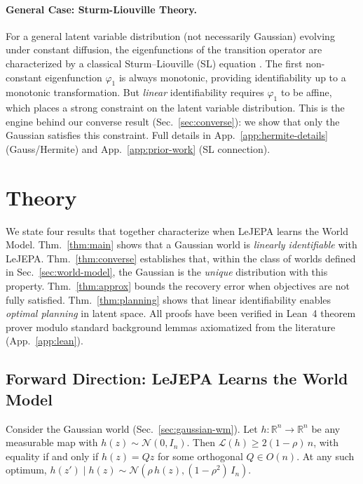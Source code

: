 \documentclass{article}
\makeatletter
\newcounter{thmcounter}
\renewcommand{\thethmcounter}{\arabic{thmcounter}}
\newcommand{\thmlabel}[1]{\protected@edef\@currentlabel{\thethmcounter}\label{#1}}
\makeatother
\begin{document}
\paragraph{General Case: Sturm-Liouville Theory.}
For a general latent variable distribution (not necessarily Gaussian) evolving under constant diffusion, the eigenfunctions of the transition operator are characterized by a classical Sturm--Liouville (SL) equation \citep{sprekeler2014}.
The first non-constant eigenfunction $\varphi_1$ is always monotonic, providing identifiability up to a monotonic transformation.
But \textit{linear} identifiability requires $\varphi_1$ to be affine, which places a strong constraint on the latent variable distribution.
This is the engine behind our converse result (Sec.~\ref{sec:converse}): we show that only the Gaussian satisfies this constraint.
Full details in App.~\ref{app:hermite-details} (Gauss/Hermite) and App.~\ref{app:prior-work} (SL connection).






\section{Theory}\label{sec:main}
We state four results that together characterize when LeJEPA learns the World Model.
Thm.~\ref{thm:main} shows that a Gaussian world is \textit{linearly identifiable} with LeJEPA.
Thm.~\ref{thm:converse} establishes that, within the class of worlds defined in Sec.~\ref{sec:world-model}, the Gaussian is the \textit{unique} distribution with this property.
Thm.~\ref{thm:approx} bounds the recovery error when objectives are not fully satisfied.
Thm.~\ref{thm:planning} shows that linear identifiability enables \textit{optimal planning} in latent space.
All proofs have been verified in Lean~4 theorem prover modulo standard background lemmas axiomatized from the literature (App.~\ref{app:lean}).


\subsection{Forward Direction: LeJEPA Learns the World Model}\label{sec:thm}

\begin{theorembox}
\thmlabel{thm:main}
Consider the Gaussian world (Sec.~\ref{sec:gaussian-wm}). Let $h: \mathbb{R}^n \to \mathbb{R}^n$ be any measurable map with $h(z) \sim \mathcal{N}(0, I_n)$. Then $\mathcal{L}(h) \geq 2(1-\rho)\,n$, with equality if and only if $h(z) = Qz$ for some orthogonal $Q \in O(n)$. At any such optimum, $h(z') \mid h(z) \sim \mathcal{N}(\rho\, h(z), (1-\rho^2)\,I_n)$.
\end{theorembox}
\end{document}
